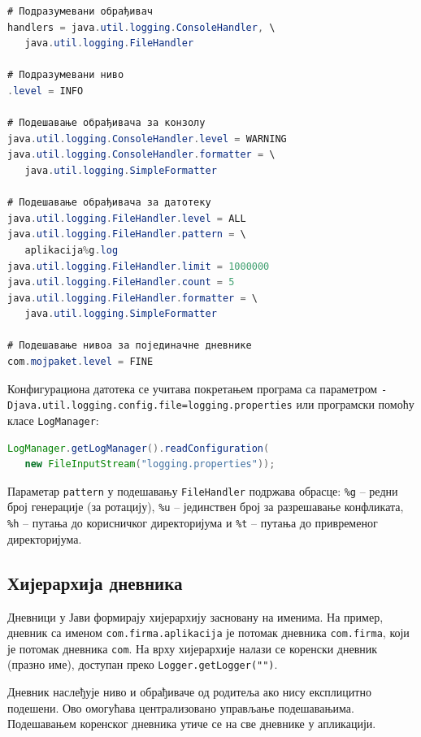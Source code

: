 \begin{lstlisting}[language=Java]
# Подразумевани обрађивач
handlers = java.util.logging.ConsoleHandler, \
   java.util.logging.FileHandler
 
# Подразумевани ниво
.level = INFO
 
# Подешавање обрађивача за конзолу
java.util.logging.ConsoleHandler.level = WARNING
java.util.logging.ConsoleHandler.formatter = \
   java.util.logging.SimpleFormatter
 
# Подешавање обрађивача за датотеку
java.util.logging.FileHandler.level = ALL
java.util.logging.FileHandler.pattern = \
   aplikacija%g.log
java.util.logging.FileHandler.limit = 1000000
java.util.logging.FileHandler.count = 5
java.util.logging.FileHandler.formatter = \
   java.util.logging.SimpleFormatter
 
# Подешавање нивоа за појединачне дневнике
com.mojpaket.level = FINE
\end{lstlisting}


Конфигурациона датотека се учитава покретањем програма са параметром \texttt{-Djava.util.logging.config.file=logging.properties} или програмски помоћу класе \texttt{LogManager}:


\begin{lstlisting}[language=Java]
LogManager.getLogManager().readConfiguration(
   new FileInputStream("logging.properties"));
\end{lstlisting}


Параметар \texttt{pattern} у подешавању \texttt{FileHandler} подржава обрасце: \texttt{\%g} – редни број генерације (за ротацију), \texttt{\%u} – јединствен број за разрешавање конфликата, \texttt{\%h} – путања до корисничког директоријума и \texttt{\%t} – путања до привременог директоријума.


\subsection{Хијерархија дневника}

Дневници у Јави формирају хијерархију засновану на именима. На пример, дневник са именом \texttt{com.firma.aplikacija} је потомак дневника \texttt{com.firma}, који је потомак дневника \texttt{com}. На врху хијерархије налази се коренски дневник (празно име), доступан преко \texttt{Logger.getLogger("")}.

Дневник наслеђује ниво и обрађиваче од родитеља ако нису експлицитно подешени. Ово омогућава централизовано управљање подешавањима. Подешавањем коренског дневника утиче се на све дневнике у апликацији.


